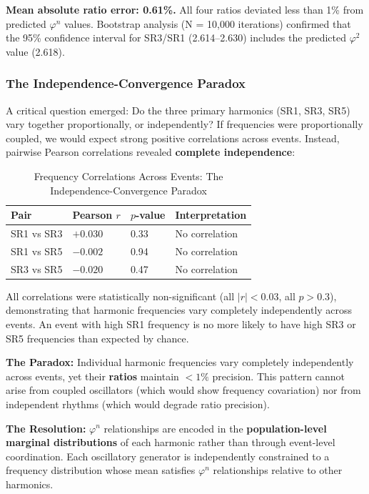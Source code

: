 \documentclass[11pt,a4paper]{article}
\newcommand{\phisym}{\varphi}
\begin{document}
\textbf{Mean absolute ratio error: 0.61\%.} All four ratios deviated less than 1\% from predicted $\phisym^n$ values. Bootstrap analysis (N = 10,000 iterations) confirmed that the 95\% confidence interval for SR3/SR1 (2.614--2.630) includes the predicted $\phisym^2$ value (2.618).

\subsubsection{The Independence-Convergence Paradox}
A critical question emerged: Do the three primary harmonics (SR1, SR3, SR5) vary together proportionally, or independently? If frequencies were proportionally coupled, we would expect strong positive correlations across events. Instead, pairwise Pearson correlations revealed \textbf{complete independence}:

\begin{table}[H]
\centering
\caption{Frequency Correlations Across Events: The Independence-Convergence Paradox}
\label{tab:independence}
\begin{tabular}{llll}
\toprule
Pair & Pearson $r$ & $p$-value & Interpretation \\
\midrule
SR1 vs SR3 & $+0.030$ & 0.33 & No correlation \\
SR1 vs SR5 & $-0.002$ & 0.94 & No correlation \\
SR3 vs SR5 & $-0.020$ & 0.47 & No correlation \\
\bottomrule
\end{tabular}
\end{table}

All correlations were statistically non-significant (all $|r| < 0.03$, all $p > 0.3$), demonstrating that harmonic frequencies vary completely independently across events. An event with high SR1 frequency is no more likely to have high SR3 or SR5 frequencies than expected by chance.

\begin{keyinsight}
\textbf{The Paradox:} Individual harmonic frequencies vary completely independently across events, yet their \textbf{ratios} maintain $<1\%$ precision. This pattern cannot arise from coupled oscillators (which would show frequency covariation) nor from independent rhythms (which would degrade ratio precision).

\textbf{The Resolution:} $\phisym^n$ relationships are encoded in the \textbf{population-level marginal distributions} of each harmonic rather than through event-level coordination. Each oscillatory generator is independently constrained to a frequency distribution whose mean satisfies $\phisym^n$ relationships relative to other harmonics.
\end{keyinsight}
\end{document}
